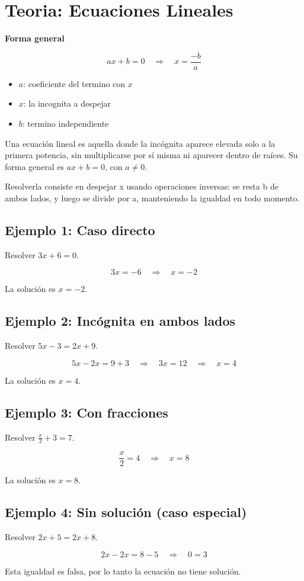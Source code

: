 \documentclass{article}
\begin{document}
\section*{Teoria: Ecuaciones Lineales}

\textbf{Forma general}

{\Large \[ ax + b = 0 \quad \Rightarrow \quad x = \frac{-b}{a} \] }

\begin{itemize}
\item {\Large \(a\)}: coeficiente del termino con \(x\)
\item {\Large \(x\)}: la incognita a despejar
\item {\Large \(b\)}: termino independiente
\end{itemize}

Una ecuación lineal es aquella donde la incógnita aparece elevada solo a la
primera potencia, sin multiplicarse por sí misma ni aparecer dentro de raíces.
Su forma general es \(ax + b = 0\), con \(a \neq 0\).

Resolverla consiste en despejar x usando operaciones inversas: se resta b
de ambos lados, y luego se divide por a, manteniendo la igualdad en todo momento.

\subsection*{Ejemplo 1: Caso directo}
Resolver \(3x + 6 = 0\).

\[ 3x = -6 \quad \Rightarrow \quad x = -2 \]

La solución es \(x = -2\).

\subsection*{Ejemplo 2: Incógnita en ambos lados}
Resolver \(5x - 3 = 2x + 9\).

\[ 5x - 2x = 9 + 3 \quad \Rightarrow \quad 3x = 12 \quad \Rightarrow \quad x = 4 \]

La solución es \(x = 4\).

\subsection*{Ejemplo 3: Con fracciones}
Resolver \(\frac{x}{2} + 3 = 7\).

\[ \frac{x}{2} = 4 \quad \Rightarrow \quad x = 8 \]

La solución es \(x = 8\).

\subsection*{Ejemplo 4: Sin solución (caso especial)}
Resolver \(2x + 5 = 2x + 8\).

\[ 2x - 2x = 8 - 5 \quad \Rightarrow \quad 0 = 3 \]

Esta igualdad es falsa, por lo tanto la ecuación no tiene solución.
\end{document}
